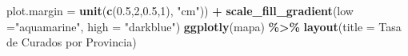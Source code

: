 \documentclass[
]{book}
\newenvironment{Shaded}{\begin{snugshade}}{\end{snugshade}}
\newcommand{\DataTypeTok}[1]{\textcolor[rgb]{0.13,0.29,0.53}{#1}}
\newcommand{\DecValTok}[1]{\textcolor[rgb]{0.00,0.00,0.81}{#1}}
\newcommand{\FloatTok}[1]{\textcolor[rgb]{0.00,0.00,0.81}{#1}}
\newcommand{\KeywordTok}[1]{\textcolor[rgb]{0.13,0.29,0.53}{\textbf{#1}}}
\newcommand{\NormalTok}[1]{#1}
\newcommand{\OperatorTok}[1]{\textcolor[rgb]{0.81,0.36,0.00}{\textbf{#1}}}
\newcommand{\StringTok}[1]{\textcolor[rgb]{0.31,0.60,0.02}{#1}}
\begin{document}
\begin{Shaded}
\begin{Highlighting}[]
    \DataTypeTok{plot.margin =} \KeywordTok{unit}\NormalTok{(}\KeywordTok{c}\NormalTok{(}\FloatTok{0.5}\NormalTok{,}\DecValTok{2}\NormalTok{,}\FloatTok{0.5}\NormalTok{,}\DecValTok{1}\NormalTok{), }\StringTok{"cm"}\NormalTok{)) }\OperatorTok{+}
\StringTok{  }\KeywordTok{scale\_fill\_gradient}\NormalTok{(}\DataTypeTok{low =}\StringTok{"aquamarine"}\NormalTok{, }\DataTypeTok{high =} \StringTok{"darkblue"}\NormalTok{)}
\KeywordTok{ggplotly}\NormalTok{(mapa) }\OperatorTok{\%\textgreater{}\%}\StringTok{  }
\StringTok{  }\KeywordTok{layout}\NormalTok{(}\DataTypeTok{title =} \StringTok{\textquotesingle{}Tasa de Curados por Provincia\textquotesingle{}}\NormalTok{)}
\end{Highlighting}
\end{Shaded}

\hypertarget{htmlwidget-fa43c3e4e6439b0c5aa5}{}
\end{document}
